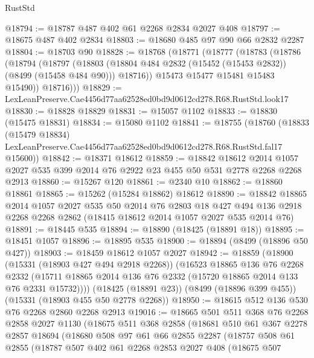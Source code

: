 \begin{lexlean}{RustStd}
\begin{coremodule}
@18794 := @18787 @487 @402 @61 @2268 @2834 @2027 @408
@18797 := @18675 @487 @402 @2834
@18803 := @18680 @485 @97 @90 @66 @2832 @2287
@18804 := @18703 @90
@18828 := @18768
    (@18771
      (@18777
        (@18783
          (@18786
            (@18794
              (@18797
                (@18803
                  (@18804 @484 @2832 (@15452 (@15453 @2832)) (@8499 (@15458 @484 @90)))
                  @18716))
              @15473
              @15477
              @15481
              @15483
              @15490))
          @18716)))
@18829 := LexLeanPreserve.Cae4456d77aa62528ed0bd9d0612cd278.R68.RustStd.look17
@18830 := @18828 @18829
@18831 := @15057 @1102
@18833 := @18830 (@15475 @18831)
@18834 := @15080 @1102
@18841 := @18755
    (@18760
      (@18833
        (@15479 @18834)
        LexLeanPreserve.Cae4456d77aa62528ed0bd9d0612cd278.R68.RustStd.fal17
        @15600))
@18842 := @18371 @18612
@18859 := @18842
    @18612
    @2014
    @1057
    @2027
    @535
    @399
    @2014
    @76
    @2922
    @23
    @455
    @50
    @531
    @2778
    @2268
    @2268
    @2913
@18860 := @15267 @120
@18861 := @2340 @10
@18862 := @18860 @18861
@18865 := @15262 (@15284 @18862) @18612
@18890 := @18842
    @18865
    @2014
    @1057
    @2027
    @535
    @50
    @2014
    @76
    @2803
    @18
    @427
    @494
    @136
    @2918
    @2268
    @2268
    @2862
    (@18415 @18612 @2014 @1057 @2027 @535 @2014 @76)
@18891 := @18445 @535
@18894 := @18890 (@18425 (@18891 @18))
@18895 := @18451 @1057
@18896 := @18895 @535
@18900 := @18894 (@8499 (@18896 @50 @427))
@18903 := @18459 @18612 @1057 @2027
@18942 := @18859
    (@18900
      (@15331 (@18903 @427 @494 @2918 @2268))
      (@16523
        @18865
        @136
        @76
        @2268
        @2332
        (@15711 @18865 @2014 @136 @76 @2332 (@15720 @18865 @2014 @133 @76 @2331 @15732))))
    (@18425 (@18891 @23))
    (@8499 (@18896 @399 @455))
    (@15331 (@18903 @455 @50 @2778 @2268))
@18950 := @18615 @512 @136 @530 @76 @2268 @2860 @2268 @2913
@19016 := @18665
    @501
    @511
    @368
    @76
    @2268
    @2858
    @2027
    @1130
    (@18675
      @511
      @368
      @2858
      (@18681
        @510
        @61
        @367
        @2278
        @2857
        @18694
        (@18680
          @508
          @97
          @61
          @66
          @2855
          @2287
          (@18757
            @508
            @61
            @2855
            (@18787
              @507
              @402
              @61
              @2268
              @2853
              @2027
              @408
              (@18675
                @507

\end{coremodule}
\end{lexlean}
